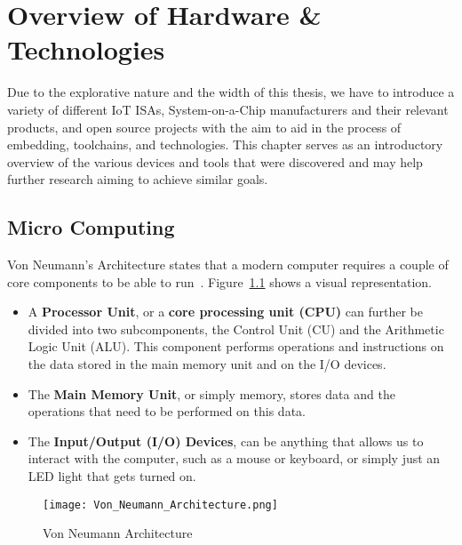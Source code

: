 \chapter{Overview of Hardware \& Technologies}

Due to the explorative nature and the width of this thesis, we have to introduce a variety of different IoT ISAs, System-on-a-Chip manufacturers and their relevant products, and open source projects with the aim to aid in the process of embedding, toolchains, and technologies. This chapter serves as an introductory overview of the various devices and tools that were discovered and may help further research aiming to achieve similar goals.

\section{Micro Computing} \label{mcuvsmpu.ch}
Von Neumann's Architecture states that a modern computer requires a couple of core components to be able to run~\cite{arikpo2007neumann}. Figure~\ref{fig:vonNeumanng} shows a visual representation.
\begin{itemize}
\item A \textbf{Processor Unit}, or a \textbf{core processing unit (CPU)} can further be divided into two subcomponents, the Control Unit (CU) and the Arithmetic Logic Unit (ALU). This component performs operations and instructions on the data stored in the main memory unit and on the I/O devices.
\item The \textbf{Main Memory Unit}, or simply memory, stores data and the operations that need to be performed on this data.
\item The \textbf{Input/Output (I/O) Devices}, can be anything that allows us to interact with the computer, such as a mouse or keyboard, or simply just an LED light that gets turned on.
\end{itemize}

\begin{figure}
\centering
\texttt{[image: Von\_Neumann\_Architecture.png]}
\caption{Von Neumann Architecture~\cite{vonNeumannpic}}
\label{fig:vonNeumanng}
\end{figure}


